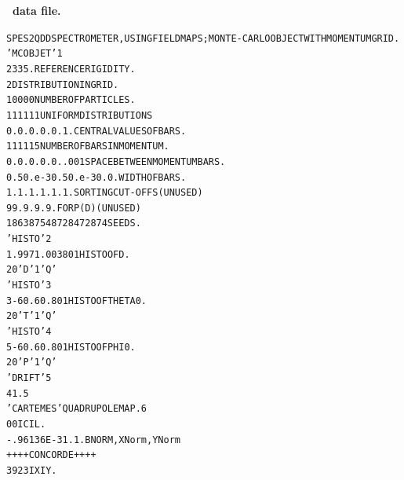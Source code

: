\begin{tiny}
\begin{center}
\twocolumn

\noindent \textbf{\normalsize \zgoubi\ data file.}

\begin{alltt}
SPES2 QDD SPECTROMETER, USING FIELD MAPS; MONTE-CARLO OBJECT WITH MOMENTUM GRID.
 'MCOBJET'                                                                    1
 2335.                                REFERENCE  RIGIDITY.                      
 2                                    DISTRIBUTION  IN  GRID.                   
 10000                                NUMBER  OF  PARTICLES.                    
 1   1   1   1   1   1                UNIFORM DISTRIBUTIONS                     
 0.  0.  0.  0.  0.  1.               CENTRAL  VALUES  OF  BARS.                
 1   1   1   1   1   5                NUMBER  OF  BARS  IN  MOMENTUM.           
 0.  0.  0.  0.  0.  .001             SPACE  BETWEEN  MOMENTUM  BARS.           
 0.  50.e-3 0.  50.e-3 0.  0.         WIDTH  OF  BARS.                          
 1.  1.  1.  1.  1.  1.               SORTING CUT-OFFS (UNUSED)                 
 9   9. 9. 9. 9.                      FOR P(D) (UNUSED)                         
 186387 548728 472874                 SEEDS.                                    
  'HISTO'                                                                     2
  1   .997   1.003  80  1             HISTO  OF  D.                             
  20  'D'  1  'Q'                                                               
  'HISTO'                                                                     3
  3   -60.  60.     80  1             HISTO  OF  THETA0.                        
  20  'T'  1  'Q'                                                             
  'HISTO'                                                                     4
  5   -60.  60.     80  1             HISTO  OF  PHI0.                          
  20  'P'  1  'Q'                                                               
 'DRIFT'                                                                      5
 41.5                                                                           
 'CARTEMES'                           QUADRUPOLE  MAP.                        6
  0  0                                IC  IL.                                   
  -.96136E-3  1. 1.                   BNORM, XNorm,YNorm                        
 ++++  CONCORDE ++++                                                            
  39  23                              IX  IY.                                   

\end{alltt}
\end{center}
\end{tiny}
